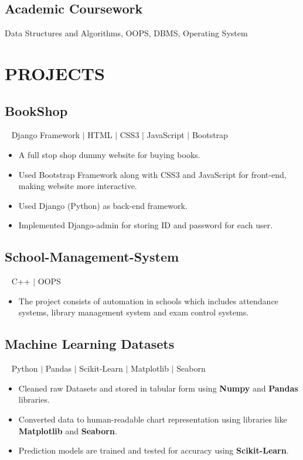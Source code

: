 \documentclass[12pt]{article}
\begin{document}
\subsection*{Academic Coursework}     \hspace*{2.10cm} Data Structures and Algorithms, OOPS, DBMS, Operating System \\

\section*{PROJECTS}
\subsection*{BookShop}~ Django Framework $\vert$ HTML $\vert$ CSS3 $\vert$ JavaScript $\vert$ Bootstrap\\
\begin{itemize}[topsep=0pt,itemsep=1pt,partopsep=1pt, parsep=1pt]
    \item A full stop shop dummy website for buying books. 
    \item Used Bootstrap Framework along with CSS3 and JavaScript for front-end, making website more interactive.
    \item Used Django (Python) as back-end framework. 
    \item Implemented Django-admin for storing ID and password for each user. 
\end{itemize}

\subsection*{School-Management-System}~ C++ $\vert$ OOPS
\begin{itemize}[topsep=0pt,itemsep=1pt,partopsep=1pt, parsep=1pt]
    \item The project consists of automation in schools which includes attendance systems, library management system and exam control systems. 
\end{itemize} 
\subsection*{Machine Learning Datasets}~ Python $\vert$ Pandas $\vert$ Scikit-Learn $\vert$ Matplotlib $\vert$ Seaborn \\
\begin{itemize}[topsep=0pt,itemsep=1pt,partopsep=1pt, parsep=1pt]
    \item Cleaned raw Datasets and stored in tabular form using \textbf{Numpy} and \textbf{Pandas} libraries.
    \item Converted data to human-readable chart representation using libraries like \textbf{Matplotlib} and \textbf{Seaborn}.
    \item Prediction models are trained and tested for accuracy using \textbf{Scikit-Learn}.
\end{itemize}
\end{document}
